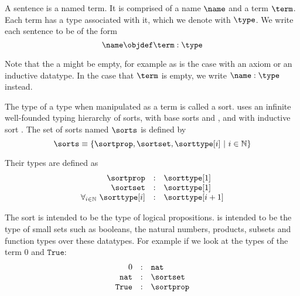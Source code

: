 \begin{definition}[sentence]
	A sentence is a named term. It is comprised of a name $\name$ and a term $\term$. Each term has a type associated with it, which we denote with $\type$.
	We write each sentence to be of the form
	\[\name \objdef \term : \type\]
\end{definition}

Note that the a might be empty, for example as is the case with an axiom or an inductive datatype.
In the case that $\term$ is empty, we write $\name : \type$ instead.

\begin{definition}[sort]
	The type of a type when manipulated as a term is called a sort.
	\pcic uses an infinite well-founded typing hierarchy of sorts, with base sorts \sortprop{} and \sortset{}, and with inductive sort \sorttype{}.
	The set of sorts named $\sorts$ is defined by
	\[\sorts \equiv \{ \sortprop, \sortset, \sorttype[{i}] ~|~ i \in \mathbb{N} \} \]

	Their types are defined as
	\[
		\begin{array}{rcl}
			\sortprop & : & \sorttype[1] \\
			\sortset & : & \sorttype[1] \\
			\forall_{i \in \mathbb{N}}~ \sorttype[i] & : & \sorttype[{i+1}]
		\end{array}
	\]
\end{definition}

The sort \sortprop is intended to be the type of logical propositions.
\sortset is intended to be the type of small sets such as booleans, the natural numbers, products, subsets and function types over these datatypes.
For example if we look at the types of the term $0$ and $\texttt{True}$:
	\[
		\begin{array}{rcl}
			0 & : & \texttt{nat} \\
			\texttt{nat} & : & \sortset \\
			\texttt{True} & : & \sortprop
		\end{array}
	\]

